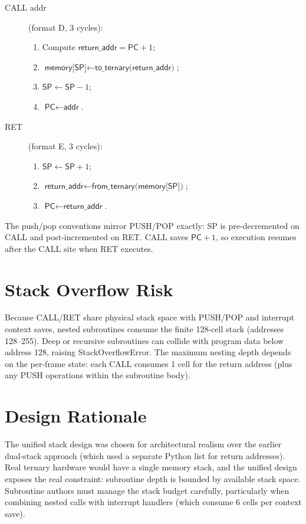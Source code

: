 \documentclass[12pt,a4paper,twoside]{book}
\theoremstyle{trinarytheorem}
\theoremstyle{trinarydefinition}
\newcommand{\code}[1]{\textsf{#1}}
\begin{document}
\begin{description}
    \item[\code{CALL addr}] (format D, 3 cycles):
          \begin{enumerate}
              \item Compute $\code{return\_addr} = \code{PC} + 1$;
              \item $\code{memory[SP]} \gets \code{to\_ternary(return\_addr)}$;
              \item $\code{SP} \gets \code{SP} - 1$;
              \item $\code{PC} \gets \code{addr}$.
          \end{enumerate}
    \item[\code{RET}] (format E, 3 cycles):
          \begin{enumerate}
              \item $\code{SP} \gets \code{SP} + 1$;
              \item $\code{return\_addr} \gets \code{from\_ternary(memory[SP])}$;
              \item $\code{PC} \gets \code{return\_addr}$.
          \end{enumerate}
\end{description}

The push/pop conventions mirror PUSH/POP exactly: SP is pre-decremented on CALL and
post-incremented on RET. CALL saves $\code{PC} + 1$, so execution resumes after the
CALL site when RET executes.

\section{Stack Overflow Risk}

Because CALL/RET share physical stack space with PUSH/POP and interrupt context saves,
nested subroutines consume the finite 128-cell stack (addresses 128--255). Deep or
recursive subroutines can collide with program data below address 128, raising
\code{StackOverflowError}. The maximum nesting depth depends on the per-frame state:
each CALL consumes 1 cell for the return address (plus any PUSH operations within
the subroutine body).

\section{Design Rationale}

The unified stack design was chosen for architectural realism over the earlier dual-stack
approach (which used a separate Python list for return addresses). Real ternary hardware
would have a single memory stack, and the unified design exposes the real constraint:
subroutine depth is bounded by available stack space. Subroutine authors must manage the
stack budget carefully, particularly when combining nested calls with interrupt handlers
(which consume 6 cells per context save).
\end{document}
